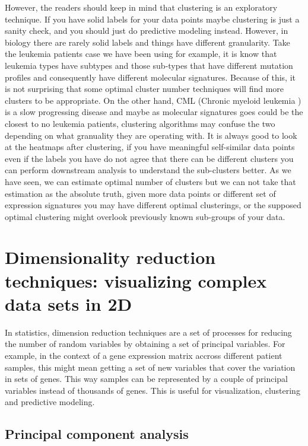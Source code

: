 \documentclass[12pt,]{krantz}
\theoremstyle{definition}
\theoremstyle{definition}
\theoremstyle{definition}
\theoremstyle{remark}
\begin{document}
However, the readers should keep in mind that clustering is an
exploratory technique. If you have solid labels for your data points
maybe clustering is just a sanity check, and you should just do
predictive modeling instead. However, in biology there are rarely solid
labels and things have different granularity. Take the leukemia patients
case we have been using for example, it is know that leukemia types have
subtypes and those sub-types that have different mutation profiles and
consequently have different molecular signatures. Because of this, it is
not surprising that some optimal cluster number techniques will find
more clusters to be appropriate. On the other hand, CML (Chronic myeloid
leukemia ) is a slow progressing disease and maybe as molecular
signatures goes could be the closest to no leukemia patients, clustering
algorithms may confuse the two depending on what granuality they are
operating with. It is always good to look at the heatmaps after
clustering, if you have meaningful self-similar data points even if the
labels you have do not agree that there can be different clusters you
can perform downstream analysis to understand the sub-clusters better.
As we have seen, we can estimate optimal number of clusters but we can
not take that estimation as the absolute truth, given more data points
or different set of expression signatures you may have different optimal
clusterings, or the supposed optimal clustering might overlook
previously known sub-groups of your data.

\hypertarget{dimensionality-reduction-techniques-visualizing-complex-data-sets-in-2d}{%
\section{Dimensionality reduction techniques: visualizing complex data
sets in
2D}\label{dimensionality-reduction-techniques-visualizing-complex-data-sets-in-2d}}

In statistics, dimension reduction techniques are a set of processes for
reducing the number of random variables by obtaining a set of principal
variables. For example, in the context of a gene expression matrix
accross different patient samples, this might mean getting a set of new
variables that cover the variation in sets of genes. This way samples
can be represented by a couple of principal variables instead of
thousands of genes. This is useful for visualization, clustering and
predictive modeling.

\hypertarget{principal-component-analysis}{%
\subsection{Principal component
analysis}\label{principal-component-analysis}}
\end{document}
